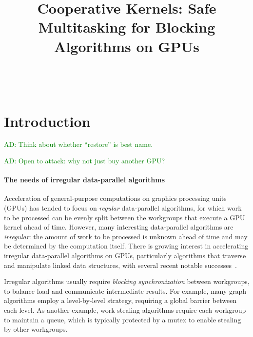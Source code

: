 \documentclass[nocopyrightspace]{sigplanconf-pldi16}
\newcommand{\ADComment}[1]{\textcolor{green}{AD: #1}}
\begin{document}
\title{Cooperative Kernels: Safe Multitasking for Blocking Algorithms on GPUs}

%
%

\authorinfo{}
{\makebox{} \\
}
{}




\maketitle

\begin{abstract}


\end{abstract}
    
\section{Introduction}\label{sec:intro}

\ADComment{Think about whether ``restore'' is best name.}

\ADComment{Open to attack: why not just buy another GPU?}

\paragraph{The needs of irregular data-parallel algorithms}
Acceleration of general-purpose computations on graphics processing
units (GPUs) has tended to focus on \emph{regular} data-parallel
algorithms, for which work to be processed can be evenly split between
the workgroups that execute a GPU kernel ahead of time.  However, many
interesting data-parallel algorithms are \emph{irregular}: the amount
of work to be processed is unknown ahead of time and may be determined
by the computation itself.  There is growing interest in accelerating irregular
data-parallel algorithms on GPUs, particularly algorithms that
traverse and manipulate linked data structures, with several recent notable
successes~\cite{...}.

Irregular algorithms usually require \emph{blocking synchronization}
between workgroups, to balance load and communicate intermediate
results.  For example, many graph algorithms employ a level-by-level strategy, requiring a global barrier between each level.
As another example, work stealing algorithms require each workgroup
to maintain a queue, which is typically protected by a mutex to enable
stealing by other workgroups.
\end{document}
